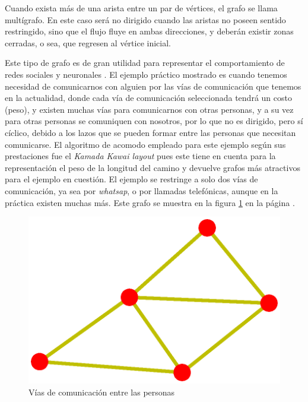 \documentclass{article}
\begin{document}
Cuando exista más de una arista entre un par de vértices, el grafo se llama multígrafo. En este caso será no dirigido cuando las aristas no poseen sentido restringido, sino que el flujo fluye en ambas direcciones, y deberán existir zonas cerradas, o sea, que regresen al vértice inicial.

Este tipo de grafo es de gran utilidad para representar el comportamiento de redes sociales y neuronales \cite{redes}. 
El ejemplo práctico mostrado es cuando tenemos necesidad de comunicarnos con alguien por las vías de comunicación que tenemos en la actualidad, donde cada vía de comunicación seleccionada tendrá un costo (peso), y existen muchas vías para comunicarnos con otras personas, y a su vez para otras personas se comuniquen con nosotros, por lo que no es dirigido, pero sí cíclico, debido a los lazos que se pueden formar entre las personas que necesitan comunicarse. El algoritmo de acomodo empleado para este ejemplo según sus prestaciones fue el \textit{Kamada Kawai layout} pues este tiene en cuenta para la representación el peso de la longitud del camino \cite{layout} y devuelve grafos más atractivos para el ejemplo en cuestión. El ejemplo se restringe a solo dos vías de comunicación, ya sea por \textit{whatsap}, o por llamadas telefónicas, aunque en la práctica existen muchas más. Este grafo se muestra en la figura \ref{fig:Fig08} en la página \pageref{fig:Fig08}. 
\newpage


\begin{figure}[htbp]
    \centering
    \includegraphics[scale=0.6]{imagenes1/Fig08.eps}
    \caption{Vías de comunicación entre las personas}
    \label{fig:Fig08}
\end{figure}
\end{document}
